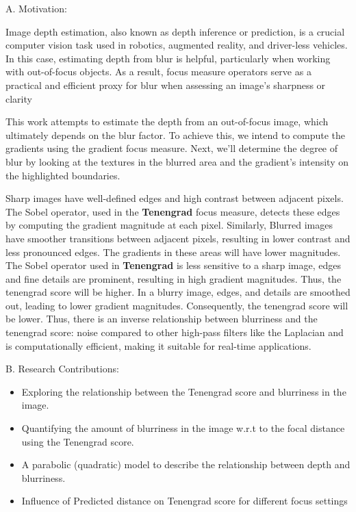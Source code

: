 \documentclass[sn-mathphys]{sn-jnl}%
\theoremstyle{thmstyleone}%
\theoremstyle{thmstyletwo}%
\theoremstyle{thmstylethree}%
\begin{document}
A. Motivation: \par
Image depth estimation, also known as depth inference or prediction, is a crucial computer vision task used in robotics, augmented reality, and driver-less vehicles. In this case, estimating depth from blur is helpful, particularly when working with out-of-focus objects. As a result, focus measure operators serve as a practical and efficient proxy for blur when assessing an image's sharpness or clarity\par

This work attempts to estimate the depth from an out-of-focus image, which ultimately depends on the blur factor. To achieve this, we intend to compute the gradients using the gradient focus measure. Next, we'll determine the degree of blur by looking at the textures in the blurred area and the gradient's intensity on the highlighted boundaries.\par

Sharp images \cite{bib1} have well-defined edges and high contrast between adjacent pixels. The Sobel operator, used in the \textbf{Tenengrad} focus measure, detects these edges by computing the gradient magnitude at each pixel. Similarly, Blurred images have smoother transitions between adjacent pixels, resulting in lower contrast and less pronounced edges. The gradients in these areas will have lower magnitudes.  The Sobel operator used in \textbf{Tenengrad} is less sensitive to a sharp image, edges and fine details are prominent, resulting in high gradient magnitudes. Thus, the tenengrad score will be higher.  In a blurry image, edges, and details are smoothed out, leading to lower gradient magnitudes. Consequently, the tenengrad score will be lower. Thus, there is an inverse relationship between blurriness and the tenengrad score: noise compared to other high-pass filters like the Laplacian and is computationally efficient, making it suitable for real-time applications.\par

 

B. Research Contributions:
\begin{itemize}
  \item Exploring the relationship between the Tenengrad score and blurriness in the image. 

  \item Quantifying the amount of blurriness in the image w.r.t to the focal distance using the Tenengrad score.

  \item A parabolic (quadratic) model to describe the relationship between depth and blurriness.

  \item Influence of Predicted distance on Tenengrad score for different focus settings
  
\end{itemize}
\end{document}

